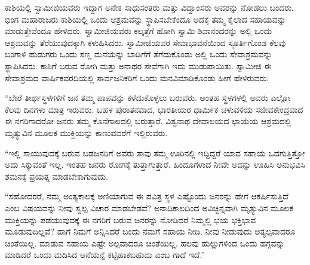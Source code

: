  ಕಾಶಿಯಲ್ಲಿ ಸ್ವಾಮೀಜಿಯವರು ಇದ್ದಾಗ ಅನೇಕ ಸಾಧುಸಂತರು ಮತ್ತು ವಿದ್ವಾಂಸರು ಅವರನ್ನು ನೋಡಲು ಬಂದರು. ಭಿಂಗ ಮಹಾರಾಜರು ಕಾಶಿಯಲ್ಲಿ ಒಂದು ಆಶ್ರಮವನ್ನು ಸ್ಥಾಪಿಸಬೇಕೆಂದೂ ಅದಕ್ಕೆ ತಮ್ಮ ಕೈಲಾದ ಸಹಾಯವನ್ನು ಮಾಡುತ್ತೇವೆಂದೂ ಹೇಳಿದರು. ಸ್ವಾಮೀಜಿಯವರು ಕಲ್ಕತ್ತೆಗೆ ಹೋಗಿ ಸ್ವಾಮಿ ಶಿವಾನಂದರನ್ನು ಅಲ್ಲಿ ಒಂದು ಆಶ್ರಮವನ್ನು ತೆರೆಯುವುದಕ್ಕಾಗಿ ಕಳುಹಿಸಿದರು. ಸ್ವಾಮೀಜಿಯವರ ಸೇವಾಭಾವನೆಯಿಂದ ಸ್ಫೂರ್ತಿಗೊಂಡ ಕೆಲವು ಬಂಗಾಳಿ ಹುಡುಗರು ಒಂದು ಸಣ್ಣ ಮನೆಯನ್ನು ಬಾಡಿಗೆಗೆ ತೆಗೆದುಕೊಂಡು ಅಲ್ಲಿ ಒಂದು ಸೇವಾಶ್ರಮವನ್ನು ಸ್ಥಾಪಿಸಿದರು. ಕಾಶಿಗೆ ಬರುವ ರೋಗಿ ಮತ್ತು ಅನಾಥರ ಸೇವೆಗಾಗಿ ಇದು ಮುಡುಪಾಯಿತು. ಸ್ವಾಮೀಜಿ ಈ ಸೇವಾಶ್ರಮದ ವಾರ್ಷಿಕವರದಿಯಲ್ಲಿ ಸಾರ್ವಜನಿಕರಿಗೆ ಒಂದು ಮನವಿಮಾಡಿಕೊಂಡು ಹೀಗೆ ಹೇಳಿರುವರು: 

 “ಬೇರೆ ತೀರ್ಥಸ್ಥಳಗಳಿಗೆ ಜನ ತಮ್ಮ ಪಾಪವನ್ನು ಕಳೆದುಕೊಳ್ಳಲು ಬರುವರು. ಅಂತಹ ಸ್ಥಳಗಳಲ್ಲಿ ಅವರು ಎಲ್ಲೋ ಕೆಲವು ದಿನಗಳು ಮಾತ್ರ ಇರುವರು. ಬಹಳ ಪುರಾತನವಾದ, ಭಾರತೀಯರ ಧಾರ್ಮಿಕ ಚಳುವಳಿಯ ಸಜೀವಕೇಂದ್ರವಾದ ಈ ನಗರಿಗಾದರೋ ಜನರು ತಮ್ಮ ಕೊನೆಗಾಲದಲ್ಲಿ ಬರುತ್ತಾರೆ. ವಿಶ್ವನಾಥ ದೇವಾಲಯದ ಛಾಯೆಯ ಆಶ್ರಮದಲ್ಲಿ ಮೃತ್ಯುವಿನ ಮೂಲಕ ಮುಕ್ತಿಯನ್ನು ಕಾಣುವವರೆಗೆ ಇಲ್ಲಿರುವರು. 

 “ಇಲ್ಲಿ ಸಾಯುವುದಕ್ಕೆ ಬರುವ ಬಡಜನರಿಗೆ ಅವರು ತಾವು ತಮ್ಮ ಊರಿನಲ್ಲಿ ಇದ್ದಿದ್ದರೆ ಯಾವ ಸಹಾಯ ಒದಗುತ್ತಿತ್ತೋ ಅದು ಸಿಕ್ಕುವಂತೆ ಇಲ್ಲ. ಇಂತಹ ಜನರು ರೋಗಕ್ಕೆ ತುತ್ತಾಗುತ್ತಾರೆ. ಹಿಂದೂಗಳಾದ ನೀವೇ ಅದನ್ನು ಊಹಿಸಿ ಅನುಭವಿಸಿ ಶಮನಕ್ಕೆ ಪ್ರಯತ್ನ ಮಾಡಬೇಕಾಗುವುದು.

 “ಸಹೋದರರೆ, ನಮ್ಮ ಅಂತ್ಯಕಾಲಕ್ಕೆ ಅಣಿಯಾಗುವ ಈ ಪವಿತ್ರ ಸ್ಥಳ ಎಷ್ಟೊಂದು ಜನರನ್ನು ಹೇಗೆ ಆಕರ್ಷಿಸುತ್ತಿದೆ ಎಂಬ ವಿಷಯವನ್ನು ನೀವು ಸ್ವಲ್ಪ ವಿಚಾರ ಮಾಡಬೇಡವೆ? ಅನಾದಿಕಾಲದಿಂದ ಅವಿಚ್ಛಿನ್ನವಾಗಿ ಮೃತ್ಯುವಿನ ಮೂಲಕ ಮುಕ್ತಿಯನ್ನು ಪಡೆಯುವುದಕ್ಕೆ ಈ ನಗರಿಗೆ ಬರುವ ಜನರನ್ನು ನೋಡಿದರೆ ನಿಮ್ಮಲ್ಲಿ ಭಯ ಭಕ್ತಿಭಾವ ಮೂಡುವುದಿಲ್ಲವೆ? ಹಾಗೆ ನಿಮಗೆ ಅನ್ನಿಸಿದರೆ ಬಂದು ನಮಗೆ ಸಹಾಯ ನೀಡಿ. ನೀವು ನೀಡುವುದು ಅತ್ಯಲ್ಪವಾದರೂ ಚಿಂತೆಯಿಲ್ಲ. ಮಾಡುವ ಸಹಾಯ ಎಷ್ಟೇ ಅಲ್ಪವಾದರೂ ಚಿಂತೆಯಿಲ್ಲ. ಹಲವು ಹುಲ್ಲುಗಳಿಂದ ಒಂದು ಹಗ್ಗವನ್ನು ಮಾಡಿದರೆ ಒಂದು ಮದಿಸಿದ ಆನೆಯನ್ನೆ ಕಟ್ಟಿಹಾಕಬಹುದು ಎಂಬ ಗಾದೆ ಇದೆ.” 

